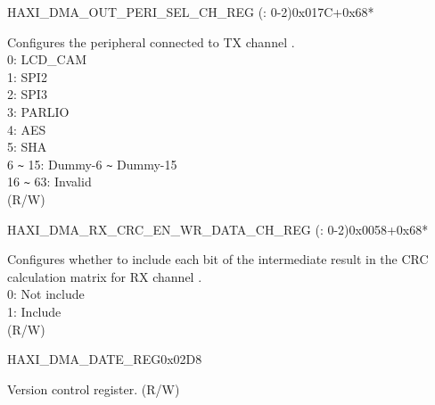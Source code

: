 \begin{register}{H}{AXI\_DMA\_OUT\_PERI\_SEL\_CH\_REG (: 0-2)}{0x017C+0x68*}\label{regdesc:AXIDMAOUTPERISELCHNREG}
%
%
\regnewline%
\begin{regdesc}\begin{reglist}
\label{fielddesc:AXIDMAPERIOUTSELCHN}\item [AXI\_DMA\_PERI\_OUT\_SEL\_CH\regindex{n}] Configures the peripheral connected to TX channel .\\
0: LCD\_CAM\\
1: SPI2\\
2: SPI3\\
3: PARLIO\\
4: AES\\
5: SHA\\
6 \verb+~+ 15: Dummy-6 \verb+~+ Dummy-15\\
16 \verb+~+ 63: Invalid\\
(R/W)
\end{reglist}\end{regdesc}
\end{register}


\begin{register}{H}{AXI\_DMA\_RX\_CRC\_EN\_WR\_DATA\_CH\_REG (: 0-2)}{0x0058+0x68*}\label{regdesc:AXIDMARXCRCENWRDATACHNREG}
%
\regnewline%
\begin{regdesc}\begin{reglist}
\label{fielddesc:AXIDMARXCRCENWRDATACHN}\item [AXI\_DMA\_RX\_CRC\_EN\_WR\_DATA\_CH\regindex{n}] Configures whether to include each bit of the intermediate result in the CRC calculation matrix for RX channel .\\
0: Not include\\
1: Include\\ (R/W)
\end{reglist}\end{regdesc}
\end{register}


\begin{register}{H}{AXI\_DMA\_DATE\_REG}{0x02D8}\label{regdesc:AXIDMADATEREG}
%
\regnewline%
\begin{regdesc}\begin{reglist}
\label{fielddesc:AXIDMADATE}\item [AXI\_DMA\_DATE] Version control register. (R/W)
\end{reglist}\end{regdesc}
\end{register}
